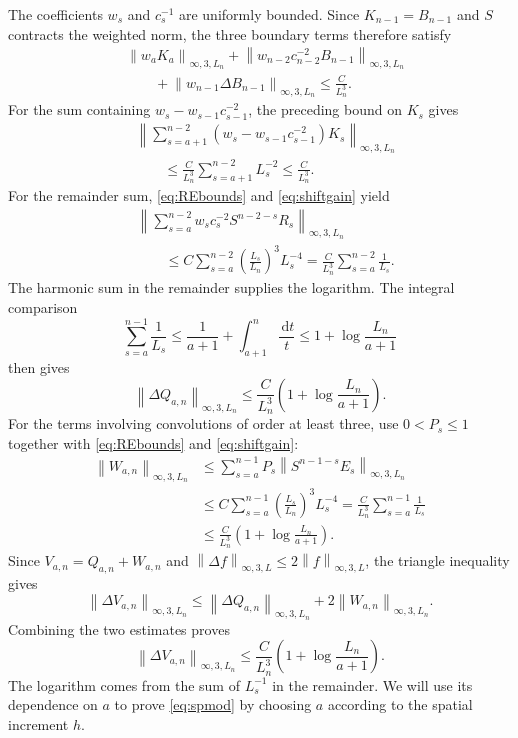 \documentclass[11pt,letterpaper,reqno]{amsart}
\numberwithin{equation}{section}
\theoremstyle{plain}
\theoremstyle{remark}
\newcommand{\dd}{\,\mathrm d}
\newcommand{\norm}[1]{\left\lVert#1\right\rVert}
\begin{document}
The coefficients $w_s$ and $c_s^{-1}$ are uniformly bounded. Since
$K_{n-1}=B_{n-1}$ and $S$ contracts the weighted norm, the three boundary
terms therefore satisfy
\[
 \begin{aligned}
 &\norm{w_aK_a}_{\infty,3,L_n}
 +\norm{w_{n-2}c_{n-2}^{-2}B_{n-1}}_{\infty,3,L_n}\\
 &\qquad+\norm{w_{n-1}\Delta B_{n-1}}_{\infty,3,L_n}
 \le \frac C{L_n^3}.
 \end{aligned}
\]
For the sum containing $w_s-w_{s-1}c_{s-1}^{-2}$, the preceding bound on $K_s$ gives
\[
 \begin{aligned}
 &\left\|\sum_{s=a+1}^{n-2}
   (w_s-w_{s-1}c_{s-1}^{-2})K_s\right\|_{\infty,3,L_n}\\
 &\qquad\le\frac C{L_n^3}\sum_{s=a+1}^{n-2}L_s^{-2}
 \le\frac C{L_n^3}.
 \end{aligned}
\]
For the remainder sum, \eqref{eq:REbounds} and \eqref{eq:shiftgain} yield
\[
 \begin{aligned}
 &\left\|\sum_{s=a}^{n-2}
    w_sc_s^{-2}S^{n-2-s}R_s\right\|_{\infty,3,L_n}\\
 &\qquad\le C\sum_{s=a}^{n-2}
    \left(\frac{L_s}{L_n}\right)^3 L_s^{-4}
 =\frac C{L_n^3}\sum_{s=a}^{n-2}\frac1{L_s}.
 \end{aligned}
\]
The harmonic sum in the remainder supplies the logarithm. The integral comparison
\[
 \sum_{s=a}^{n-1}\frac1{L_s}
 \le\frac1{a+1}+\int_{a+1}^{n}\frac{\dd t}{t}
 \le1+\log\frac{L_n}{a+1}
\]
then gives
\begin{equation*}
 \norm{\Delta Q_{a,n}}_{\infty,3,L_n}
 \le \frac C{L_n^3}\left(1+\log\frac{L_n}{a+1}\right).
\end{equation*}
For the terms involving convolutions of order at least three, use $0<P_s\le1$ together with
\eqref{eq:REbounds} and \eqref{eq:shiftgain}:
\[
 \begin{aligned}
 \norm{W_{a,n}}_{\infty,3,L_n}
 &\le\sum_{s=a}^{n-1}P_s
       \norm{S^{n-1-s}E_s}_{\infty,3,L_n}\\
 &\le C\sum_{s=a}^{n-1}
       \left(\frac{L_s}{L_n}\right)^3 L_s^{-4}
 =\frac C{L_n^3}\sum_{s=a}^{n-1}\frac1{L_s}\\
 &\le\frac C{L_n^3}\left(1+\log\frac{L_n}{a+1}\right).
 \end{aligned}
\]
Since $V_{a,n}=Q_{a,n}+W_{a,n}$ and
$\norm{\Delta f}_{\infty,3,L}\le2\norm f_{\infty,3,L}$, the triangle
inequality gives
\[
 \norm{\Delta V_{a,n}}_{\infty,3,L_n}
 \le\norm{\Delta Q_{a,n}}_{\infty,3,L_n}
    +2\norm{W_{a,n}}_{\infty,3,L_n}.
\]
Combining the two estimates proves
\begin{equation}\label{eq:lateV}
 \norm{\Delta V_{a,n}}_{\infty,3,L_n}
 \le \frac C{L_n^3}\left(1+\log\frac{L_n}{a+1}\right).
\end{equation}
The logarithm comes from the sum of $L_s^{-1}$ in the remainder. We will use its dependence on $a$ to prove \eqref{eq:spmod} by choosing $a$ according to the spatial increment $h$.
\end{document}

